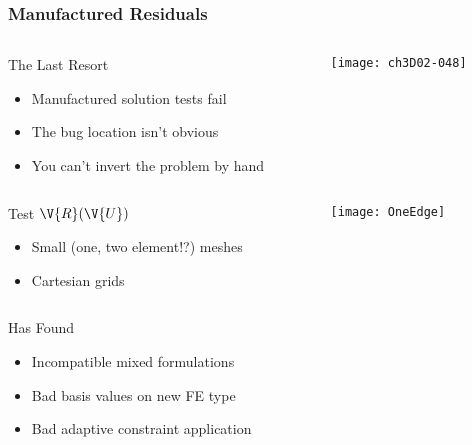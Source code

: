 \begin{frame}
\frametitle{Manufactured Residuals}
\begin{columns}
\begin{column}{.6\textwidth}
\begin{block}{The Last Resort}
\begin{itemize}
\item Manufactured solution tests fail
\item The bug location isn't obvious
\item You can't invert the problem by hand
\end{itemize}
\end{block}
\end{column}
\begin{column}{.4\textwidth}
\begin{center}
\texttt{[image: ch3D02-048]}
\end{center}
\end{column}
\end{columns}

\pause

\begin{columns}
\begin{column}{.6\textwidth}
\begin{block}{Test $\V{R}(\V{U})$}
\begin{itemize}
\item Small (one, two element!?) meshes
\item Cartesian grids
\end{itemize}
\end{block}
\end{column}
\begin{column}{.4\textwidth}
\begin{center}
\texttt{[image: OneEdge]}
\end{center}
\end{column}
\end{columns}

\pause

\begin{block}{Has Found}
\begin{itemize}
\item Incompatible mixed formulations
\item Bad basis values on new FE type
\item Bad adaptive constraint application
\end{itemize}
\end{block}
\end{frame}

